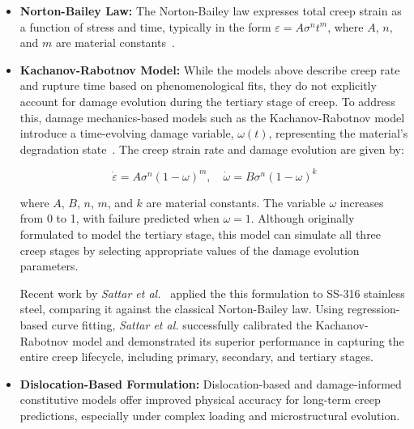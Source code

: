 \documentclass[class=scrbook, crop=false]{standalone}
\begin{document}
\begin{itemize}
	An alternative form also estimates time to rupture:
	\[
	\ln t_r = A - B \left( \frac{\sigma}{\sigma_y} \right)
	\]
	where \( t_r \) is rupture time and \( A \), \( B \) are temperature-dependent material constants. The Wilshire model is particularly useful for high-strength materials such as martensitic steels and nickel-based superalloys, where classical Norton-Bailey models fail to capture observed non-linear creep behaviour~\cite{wilshire2007creep}.
	
	\item \textbf{Norton-Bailey Law:} 
	The Norton-Bailey law expresses total creep strain as a function of stress and time, typically in the form \( \varepsilon = A \sigma^n t^m \), where \( A \), \( n \), and \( m \) are material constants~\cite{norton1929creep, bailey1930creep}.

	\item \textbf{Kachanov-Rabotnov Model:} 
	While the models above describe creep rate and rupture time based on phenomenological fits, they do not explicitly account for damage evolution during the tertiary stage of creep. To address this, damage mechanics-based models such as the Kachanov-Rabotnov model introduce a time-evolving damage variable, $\omega(t)$, representing the material’s degradation state~\cite{kachanov1958rupture, rabotnov1969creep}. The creep strain rate and damage evolution are given by:
		
	\[
	\dot{\varepsilon} = A \sigma^n (1 - \omega)^m, \quad \dot{\omega} = B \sigma^n (1 - \omega)^k
	\]
	
	where $A$, $B$, $n$, $m$, and $k$ are material constants. The variable $\omega$ increases from 0 to 1, with failure predicted when $\omega = 1$. Although originally formulated to model the tertiary stage, this model can simulate all three creep stages by selecting appropriate values of the damage evolution parameters.
	
	Recent work by \textit{Sattar et al.}~\cite{sattar2021damage} applied the this formulation to SS-316 stainless steel, comparing it against the classical Norton-Bailey law. Using regression-based curve fitting, \textit{Sattar et al.} successfully calibrated the Kachanov-Rabotnov model and demonstrated its superior performance in capturing the entire creep lifecycle, including primary, secondary, and tertiary stages.
	
	\item \textbf{Dislocation-Based Formulation:}  
	Dislocation-based and damage-informed constitutive models offer improved physical accuracy for long-term creep predictions, especially under complex loading and microstructural evolution.
	

\end{itemize}
\end{document}
